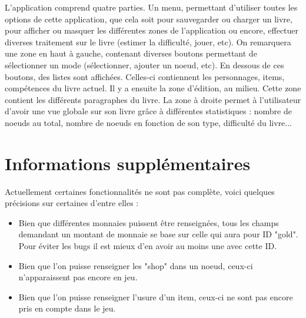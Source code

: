 		L'application comprend quatre parties. Un menu, permettant d'utiliser toutes les options de cette application, que cela soit pour sauvegarder ou charger un livre, pour afficher ou masquer les différentes zones de l'application ou encore, effectuer diverses traitement sur le livre (estimer la difficulté, jouer, etc). On remarquera une zone en haut à gauche, contenant diverses boutons permettant de sélectionner un mode (sélectionner, ajouter un noeud, etc). En dessous de ces boutons, des listes sont affichées. Celles-ci contiennent les personnages, items, compétences du livre actuel. Il y a ensuite la zone d'édition, au milieu. Cette zone contient les différents paragraphes du livre. La zone à droite permet à l'utilisateur d'avoir une vue globale sur son livre grâce à différentes statistiques : nombre de noeuds au total, nombre de noeuds en fonction de son type, difficulté du livre...

	\section{Informations supplémentaires}

		Actuellement certaines fonctionnalités ne sont pas complète, voici quelques précisions sur certaines d'entre elles :

		\begin{itemize}
			\item{Bien que différentes monnaies puissent être renseignées, tous les champs demandant un montant de monnaie se base sur celle qui aura pour ID "gold". Pour éviter les bugs il est mieux d'en avoir au moins une avec cette ID.}
			\item{Bien que l'on puisse renseigner les "shop" dans un noeud, ceux-ci n'apparaissent pas encore en jeu.}
			\item{Bien que l'on puisse renseigner l'usure d'un item, ceux-ci ne sont pas encore pris en compte dans le jeu.}
		\end{itemize}
